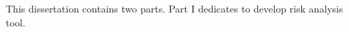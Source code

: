 \begin{summary}           %
  This dissertation contains two parts. Part I dedicates to develop
  risk analysis tool.
\end{summary}

